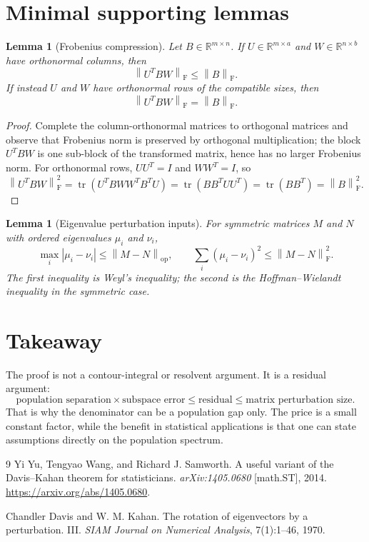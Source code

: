 \documentclass[11pt]{article}
\newcommand{\R}{\mathbb R}
\newcommand{\norm}[1]{\left\lVert #1 \right\rVert}
\newcommand{\op}{\mathrm{op}}
\newcommand{\F}{\mathrm F}
\newcommand{\tr}{\operatorname{tr}}
\newtheorem{lemma}[theorem]{Lemma}
\theoremstyle{remark}
\begin{document}
\section{Minimal supporting lemmas}

\begin{lemma}[Frobenius compression]
Let $B\in\R^{m\times n}$.  If $U\in\R^{m\times a}$ and
$W\in\R^{n\times b}$ have orthonormal columns, then
\[
  \norm{U^TBW}_{\F}\leq \norm{B}_{\F}.
\]
If instead $U$ and $W$ have orthonormal rows of the compatible sizes, then
\[
  \norm{U^TBW}_{\F}=\norm{B}_{\F}.
\]
\end{lemma}

\begin{proof}
Complete the column-orthonormal matrices to orthogonal matrices and observe
that Frobenius norm is preserved by orthogonal multiplication; the block
$U^TBW$ is one sub-block of the transformed matrix, hence has no larger
Frobenius norm.  For orthonormal rows, $UU^T=I$ and $WW^T=I$, so
\[
  \norm{U^TBW}_{\F}^2
  =\tr(U^TBWW^TB^TU)=\tr(BB^TUU^T)=\tr(BB^T)=\norm{B}_{\F}^2.
\]
\end{proof}

\begin{lemma}[Eigenvalue perturbation inputs]
For symmetric matrices $M$ and $N$ with ordered eigenvalues $\mu_i$ and
$\nu_i$,
\[
  \max_i |\mu_i-\nu_i|\leq \norm{M-N}_{\op},
  \qquad
  \sum_i(\mu_i-\nu_i)^2\leq \norm{M-N}_{\F}^2.
\]
The first inequality is Weyl's inequality; the second is the
Hoffman--Wielandt inequality in the symmetric case.
\end{lemma}

\section{Takeaway}

The proof is not a contour-integral or resolvent argument.  It is a residual
argument:
\[
  \text{population separation} \times \text{subspace error}
  \leq \text{residual}
  \leq \text{matrix perturbation size}.
\]
That is why the denominator can be a population gap only.  The price is a
small constant factor, while the benefit in statistical applications is that
one can state assumptions directly on the population spectrum.

\begin{thebibliography}{9}
Yi Yu, Tengyao Wang, and Richard J. Samworth.
\newblock A useful variant of the Davis--Kahan theorem for statisticians.
\newblock \emph{arXiv:1405.0680} [math.ST], 2014.
\newblock \url{https://arxiv.org/abs/1405.0680}.

Chandler Davis and W. M. Kahan.
\newblock The rotation of eigenvectors by a perturbation. III.
\newblock \emph{SIAM Journal on Numerical Analysis}, 7(1):1--46, 1970.
\end{thebibliography}
\end{document}

